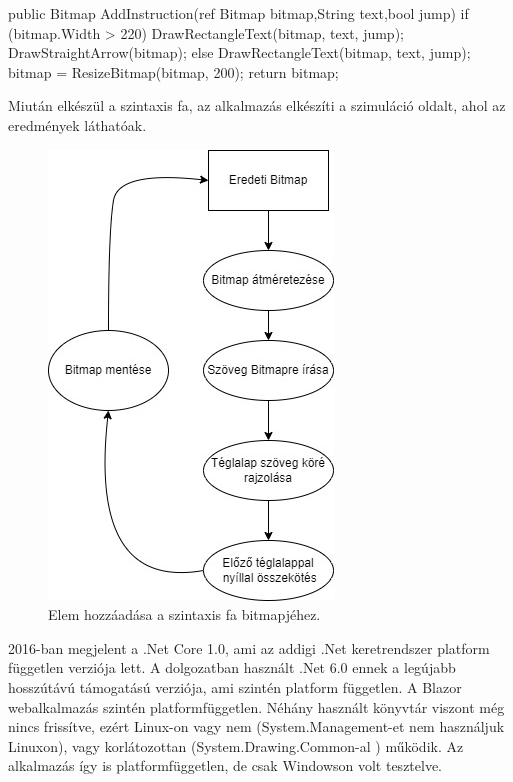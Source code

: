 \begin{cpp}
public Bitmap AddInstruction(ref Bitmap bitmap,String text,bool jump)
{
	if (bitmap.Width > 220)
    {
		DrawRectangleText(bitmap, text, jump);
        DrawStraightArrow(bitmap);
    }
    else
    {
		DrawRectangleText(bitmap, text, jump);
    }
    bitmap = ResizeBitmap(bitmap, 200);
    return bitmap;
}
\end{cpp}

Miután elkészül a szintaxis fa, az alkalmazás elkészíti a szimuláció oldalt, ahol az eredmények láthatóak.

\begin{figure}[h]
\centering
\includegraphics[scale=0.8]{images/ST.jpg}
\caption{Elem hozzáadása a szintaxis fa bitmapjéhez.}
\label{fig:st}
\end{figure}


2016-ban megjelent a .Net Core 1.0, ami az addigi .Net keretrendszer platform független verziója lett. A dolgozatban használt .Net 6.0 ennek a legújabb hosszútávú támogatású verziója, ami szintén platform független. A Blazor webalkalmazás szintén platformfüggetlen. Néhány használt könyvtár viszont még nincs  frissítve, ezért Linux-on vagy nem (System.Management-et nem használjuk Linuxon), vagy korlátozottan (System.Drawing.Common-al \cite{drawing})  működik. Az alkalmazás így is platformfüggetlen, de csak Windowson volt tesztelve.



